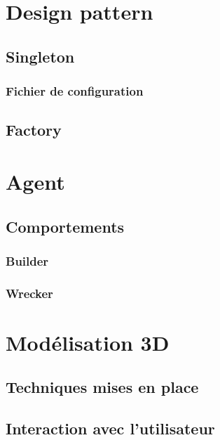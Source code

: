 \section{Design pattern}

\subsection{Singleton}

\subsubsection{Fichier de configuration}

\subsection{Factory}


\section{Agent}

\subsection{Comportements}

\subsubsection{Builder}

\subsubsection{Wrecker}


\section{Modélisation 3D}

\subsection{Techniques mises en place}

\subsection{Interaction avec l'utilisateur}
